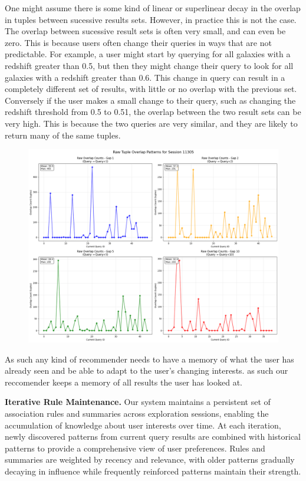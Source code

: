 \documentclass[sigconf, nonacm]{acmart}
\begin{document}
One might assume there is some kind of linear or superlinear decay in the overlap in tuples between sucessive results sets. However, in practice this is not the case. The overlap between sucessive result sets is often very small, and can even be zero. This is because users often change their queries in ways that are not predictable. For example, a user might start by querying for all galaxies with a redshift greater than 0.5, but then they might change their query to look for all galaxies with a redshift greater than 0.6. This change in query can result in a completely different set of results, with little or no overlap with the previous set.
Conversely if the user makes a small change to their query, such as changing the redshift threshold from 0.5 to 0.51, the overlap between the two result sets can be very high. This is because the two queries are very similar, and they are likely to return many of the same tuples.



\begin{figure}
\centering
\includegraphics[scale=0.2]{figures/Overlap-analysis.png} 
\end{figure}

As such any kind of recommender needs to have a memory of what the user has already seen and be able to adapt to the user's changing interests. as such our reccomender keeps a memory of all results the user has looked at.

\textbf{Iterative Rule Maintenance.} Our system maintains a persistent set of association rules and summaries across exploration sessions, enabling the accumulation of knowledge about user interests over time. At each iteration, newly discovered patterns from current query results are combined with historical patterns to provide a comprehensive view of user preferences. Rules and summaries are weighted by recency and relevance, with older patterns gradually decaying in influence while frequently reinforced patterns maintain their strength.
\end{document}
